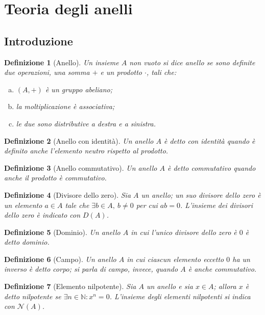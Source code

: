 \documentclass[12pt]{scrartcl}
\theoremstyle{style}
\newtheorem{definizione}{Definizione}[section]
\numberwithin{equation}{subsection}
\begin{document}
\newpage
\section{Teoria degli anelli}
\subsection{Introduzione}

\begin{definizione}
	[Anello]
	Un insieme $A$ non vuoto si dice \textit{anello} se sono definite due operazioni, una somma $+$ e un prodotto $\cdot $, tali che:
	\begin{enumerate}[(a).]
		\item $(A,+)$ \`e un gruppo abeliano;
		\item la moltiplicazione \`e associativa;
		\item le due sono distributive a destra e a sinistra.
	\end{enumerate}
\end{definizione}
\begin{definizione}
	[Anello con identit\`a]
	Un anello $A$ \`e detto \textit{con identit\`a} quando \`e definito anche l'elemento neutro rispetto al prodotto.
\end{definizione}
\begin{definizione}
	[Anello commutativo]
	Un anello $A$ \`e detto \textit{commutativo} quando anche il prodotto \`e commutativo.
\end{definizione}
\begin{definizione}
	[Divisore dello zero]
	Sia $A$ un anello; un suo \textit{divisore dello zero} \`e un elemento $a \in A$ tale che $\exists b \in A, \ b\neq 0$ per cui $ab = 0$.
	L'insieme dei divisori dello zero \`e indicato con $D(A)$.
\end{definizione}
\begin{definizione}
	[Dominio]
	Un anello $A$ in cui l'unico divisore dello zero \`e $0$ \`e detto \textit{dominio}.
\end{definizione}
\begin{definizione}
	[Campo]
	Un anello $A$ in cui ciascun elemento eccetto $0$ ha un inverso \`e detto \textit{corpo}; si parla di \textit{campo}, invece, quando $A$ \`e anche commutativo.
\end{definizione}
\begin{definizione}
	[Elemento nilpotente]
	Sia $A$ un anello e sia $x \in A$; allora $x$ \`e detto \textit{nilpotente} se $\exists n\in \mathbb{N} : x^n = 0$.
	L'insieme degli elementi nilpotenti si indica con $\mathcal{N} (A)$.
\end{definizione}
\end{document}
